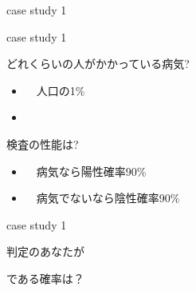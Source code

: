\documentclass[
  ignorenonframetext,
]{beamer}
\begin{document}
\begin{frame}{}
\protect\hypertarget{section}{}
\Huge

\scalebox{2}{\textcolor{softblue}{事例1}}
\end{frame}

\begin{frame}{case study 1}
\protect\hypertarget{case-study-1}{}
\Huge
\centering


\vspace*{-58pt}
\pause
{}
\end{frame}

\begin{frame}{case study 1}
\protect\hypertarget{case-study-1-1}{}
\LARGE

どれくらいの人がかかっている病気? \pause

\begin{itemize}
  \item 　\textbullet{}\hspace{2pt}人口の1\%
  \item 
  \end{itemize}
\pause

検査の性能は? \pause

\begin{itemize}
  \item 　\textbullet{}\hspace{2pt}病気なら陽性確率90\%
  \pause
  \item 　\textbullet{}\hspace{2pt}病気でないなら陰性確率90\%
  \end{itemize}
\end{frame}

\begin{frame}{case study 1}
\protect\hypertarget{case-study-1-2}{}
\Huge
\raggedleft

判定のあなたが

\par
\vspace*{-20pt}\pause
\scalebox{1}{\textcolor{red!60}{ほんとうに}}\par
\pause

\scalebox{1.4}{\textcolor{red!60}{病気}}である確率は？
\end{frame}
\end{document}
